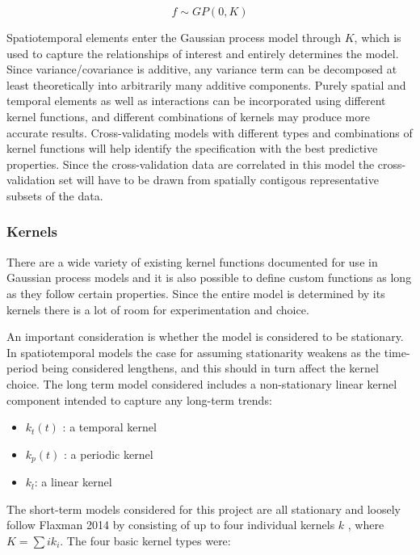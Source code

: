 $$ f \sim GP(0,K) $$

Spatiotemporal elements enter the Gaussian process model through $K$, which is used to capture the relationships of interest and entirely determines the model. Since variance/covariance is additive, any variance term can be decomposed at least theoretically into arbitrarily many additive components. Purely spatial and temporal elements as well as interactions can be incorporated using different kernel functions, and different combinations of kernels may produce more accurate results. Cross-validating models with different types and combinations of kernel functions will help identify the specification with the best predictive properties. Since the cross-validation data are correlated in this model the cross-validation set will have to be drawn from spatially contigous representative subsets of the data.

\subsubsection{Kernels}

There are a wide variety of existing kernel functions documented for use in Gaussian process models \cite{rasmussen_2005} and it is also possible to define custom functions as long as they follow certain properties. Since the entire model is determined by its kernels there is a lot of room for experimentation and choice. \par

An important consideration is whether the model is considered to be stationary. In spatiotemporal models the case for assuming stationarity weakens as the time-period being considered lengthens, and this should in turn affect the kernel choice. The long term model considered includes a non-stationary linear kernel component intended to capture any long-term trends:    \par

\begin{itemize}
  \item $k_t(t)$ : a temporal kernel
  \item $k_p(t)$ : a periodic kernel
  \item $k_l$: a linear kernel
\end{itemize}

The short-term models considered for this project are all stationary and loosely follow Flaxman 2014 by consisting of up to four individual kernels $k$ , where $K=\sum{i}k_i$. The four basic kernel types were:

